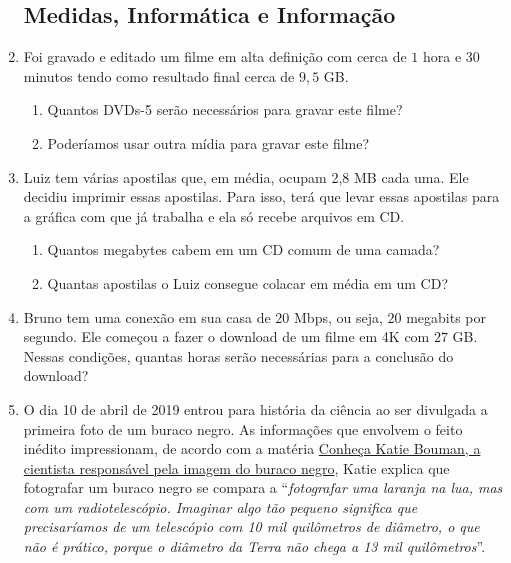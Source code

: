 \begin{enumerate}
\begin{enumerate}
\end{enumerate}

\subsection{Medidas, Informática e Informação}

\item Foi gravado e editado um filme em alta definição com cerca de $1$ hora e $30$ minutos tendo como resultado final cerca de $9{,}5$ GB.
\begin{enumerate}
\item {} 
Quantos DVDs-5 serão necessários para gravar este filme?

\item {} 
Poderíamos usar outra mídia para gravar este filme?

\end{enumerate}

\item Luiz tem várias apostilas que, em média, ocupam 2,8 MB cada uma. Ele decidiu imprimir essas apostilas. Para isso, terá que levar essas apostilas para a gráfica com que já trabalha e ela só recebe arquivos em CD.
\begin{enumerate}
\item {} 
Quantos megabytes cabem em um CD comum de uma camada?

\item {} 
Quantas apostilas o Luiz consegue colacar em média em um CD?

\end{enumerate}

\item Bruno tem uma conexão em sua casa de $20$ Mbps, ou seja, $20$ megabits por segundo. Ele começou a fazer o download de um filme em 4K com $27$ GB. Nessas condições, quantas horas serão necessárias para a conclusão do download?

\item O dia 10 de abril de 2019 entrou para história da ciência ao ser divulgada a primeira foto de um buraco negro. As informações que envolvem o feito inédito impressionam, de acordo com a matéria \href{https://www1.folha.uol.com.br/ciencia/2019/04/conheca-katie-bouman-a-cientista-responsavel-pela-imagem-do-buraco-negro.shtml}{Conheça Katie Bouman, a cientista responsável pela imagem do buraco negro}, Katie explica que fotografar um buraco negro se compara a  “\emph{fotografar uma laranja na lua, mas com um radiotelescópio. Imaginar algo tão pequeno significa que precisaríamos de um telescópio com 10 mil quilômetros de diâmetro, o que não é prático, porque o diâmetro da Terra não chega a 13 mil quilômetros}”.


\end{enumerate}

